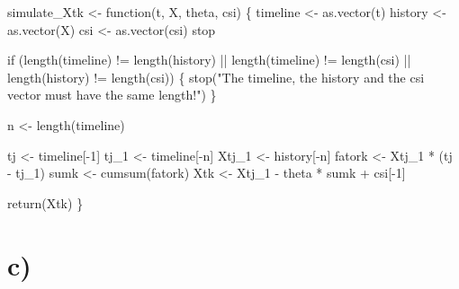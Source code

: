 \documentclass[
  letterpaper,
  DIV=11,
  numbers=noendperiod]{scrreprt}
\newenvironment{Shaded}{\begin{snugshade}}{\end{snugshade}}
\newcommand{\ControlFlowTok}[1]{\textcolor[rgb]{0.00,0.23,0.31}{#1}}
\newcommand{\DecValTok}[1]{\textcolor[rgb]{0.68,0.00,0.00}{#1}}
\newcommand{\FunctionTok}[1]{\textcolor[rgb]{0.28,0.35,0.67}{#1}}
\newcommand{\NormalTok}[1]{\textcolor[rgb]{0.00,0.23,0.31}{#1}}
\newcommand{\OtherTok}[1]{\textcolor[rgb]{0.00,0.23,0.31}{#1}}
\newcommand{\SpecialCharTok}[1]{\textcolor[rgb]{0.37,0.37,0.37}{#1}}
\newcommand{\StringTok}[1]{\textcolor[rgb]{0.13,0.47,0.30}{#1}}
\begin{document}
\begin{Shaded}
\begin{Highlighting}[]
\NormalTok{simulate\_Xtk }\OtherTok{\textless{}{-}} \ControlFlowTok{function}\NormalTok{(t, X, theta, csi) \{}
\NormalTok{    timeline }\OtherTok{\textless{}{-}} \FunctionTok{as.vector}\NormalTok{(t)}
\NormalTok{    history }\OtherTok{\textless{}{-}} \FunctionTok{as.vector}\NormalTok{(X)}
\NormalTok{    csi }\OtherTok{\textless{}{-}} \FunctionTok{as.vector}\NormalTok{(csi)}
\NormalTok{    stop}

    \ControlFlowTok{if}\NormalTok{ (}\FunctionTok{length}\NormalTok{(timeline) }\SpecialCharTok{!=} \FunctionTok{length}\NormalTok{(history) }\SpecialCharTok{||}
        \FunctionTok{length}\NormalTok{(timeline) }\SpecialCharTok{!=} \FunctionTok{length}\NormalTok{(csi) }\SpecialCharTok{||}
        \FunctionTok{length}\NormalTok{(history) }\SpecialCharTok{!=} \FunctionTok{length}\NormalTok{(csi)) \{}
        \FunctionTok{stop}\NormalTok{(}\StringTok{"The timeline, the history and the csi vector must have the same length!"}\NormalTok{)}
\NormalTok{    \}}

\NormalTok{    n }\OtherTok{\textless{}{-}} \FunctionTok{length}\NormalTok{(timeline)}

\NormalTok{    tj }\OtherTok{\textless{}{-}}\NormalTok{ timeline[}\SpecialCharTok{{-}}\DecValTok{1}\NormalTok{]}
\NormalTok{    tj\_1 }\OtherTok{\textless{}{-}}\NormalTok{ timeline[}\SpecialCharTok{{-}}\NormalTok{n]}
\NormalTok{    Xtj\_1 }\OtherTok{\textless{}{-}}\NormalTok{ history[}\SpecialCharTok{{-}}\NormalTok{n]}
\NormalTok{    fatork }\OtherTok{\textless{}{-}}\NormalTok{ Xtj\_1 }\SpecialCharTok{*}\NormalTok{ (tj }\SpecialCharTok{{-}}\NormalTok{ tj\_1)}
\NormalTok{    sumk }\OtherTok{\textless{}{-}} \FunctionTok{cumsum}\NormalTok{(fatork)}
\NormalTok{    Xtk }\OtherTok{\textless{}{-}}\NormalTok{ Xtj\_1 }\SpecialCharTok{{-}}\NormalTok{ theta }\SpecialCharTok{*}\NormalTok{ sumk }\SpecialCharTok{+}\NormalTok{ csi[}\SpecialCharTok{{-}}\DecValTok{1}\NormalTok{]}

    \FunctionTok{return}\NormalTok{(Xtk)}
\NormalTok{\}}
\end{Highlighting}
\end{Shaded}

\hypertarget{c-1}{%
\section*{c)}\label{c-1}}

\end{document}
